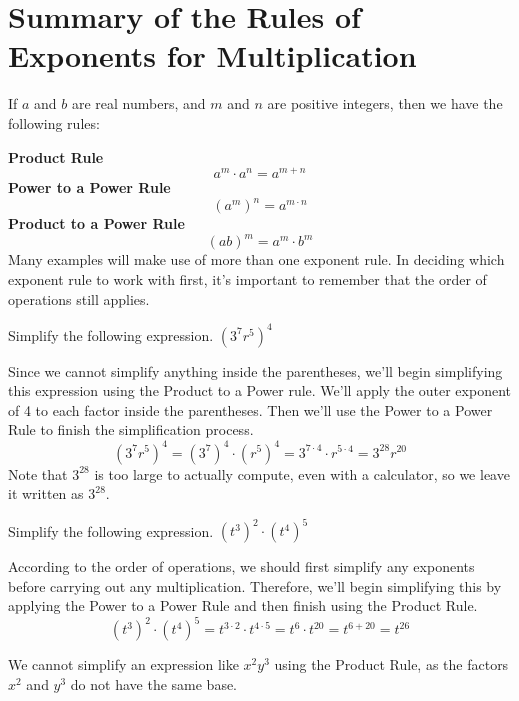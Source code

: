 \documentclass{ximera}
\begin{document}
      \section{Summary of the Rules of Exponents for Multiplication}
  


          If $a$ and $b$ are real numbers,
          and $m$ and $n$ are positive integers,
          then we have the following rules:
 
\textbf{Product Rule}
$$
            a^{m} \cdot a^{n} = a^{m+n}
$$
\textbf{Power to a Power Rule}
   $$
           (a^{m})^{n} = a^{m\cdot n}
   $$
 \textbf{Product to a Power Rule}
   $$
           (ab)^{m} = a^{m} \cdot b^{m}
   $$  
      Many examples will make use of more than one exponent rule.
      In deciding which exponent rule to work with first,
      it's important to remember that the order of operations still applies.
\begin{example} Simplify the following expression.
                $\left(3^7r^5\right)^4$\\
    \begin{explanation}
                Since we cannot simplify anything inside the parentheses, we'll begin simplifying this expression using the Product to a Power rule.
                We'll apply the outer exponent of 4 to each factor inside the parentheses.
                Then we'll use the Power to a Power Rule to finish the simplification process.
      $$          
                  \left(3^7r^5\right)^4 = \left(3^7\right)^4 \cdot \left(r^5\right)^4
                  = 3^{7\cdot4} \cdot r^{5\cdot 4}
                  = 3^{28}r^{20}
         $$      
                Note that $3^{28}$ is too large to actually compute, even with a calculator,
                so we leave it written as $3^{28}$.
\end{explanation}
\end{example}
\begin{example}
Simplify the following expression.
       $\left(t^3\right)^2\cdot \left(t^4\right)^5$\\
\begin{explanation}
                According to the order of operations,
                we should first simplify any exponents before carrying out any multiplication.
                Therefore, we'll begin simplifying this by applying the Power to a Power Rule and then finish using the Product Rule.
           $$
                  \left(t^3\right)^2\cdot \left(t^4\right)^5 = t^{3\cdot2}\cdot t^{4\cdot5}
                  = t^6 \cdot t^{20}
                  = t^{6+20}
                  = t^{26}
$$
\end{explanation}
\end{example}
 \begin{remark} 
        We cannot simplify an expression like $x^2y^3$ using the Product Rule,
        as the factors $x^2$ and $y^3$ do not have the same base.
\end{remark}
\end{document}
